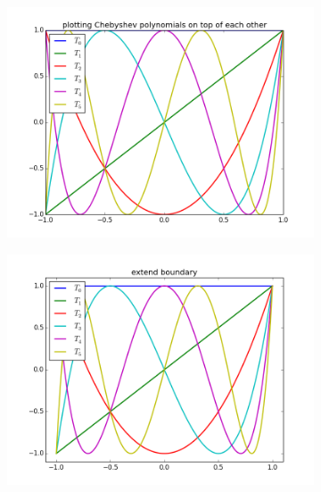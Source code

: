 \begin{figure}
\centering
\begin{subfigure}{.2\textwidth}
  \centering
  \includegraphics[width=\textwidth]{PoT.png}
\end{subfigure}%
\begin{subfigure}{.2\textwidth}
  \centering
  \includegraphics[width=\textwidth]{PoT_extend_boundary.png}
\end{subfigure}
\begin{subfigure}{.2\textwidth}
  \centering

\end{subfigure}
\end{figure}
